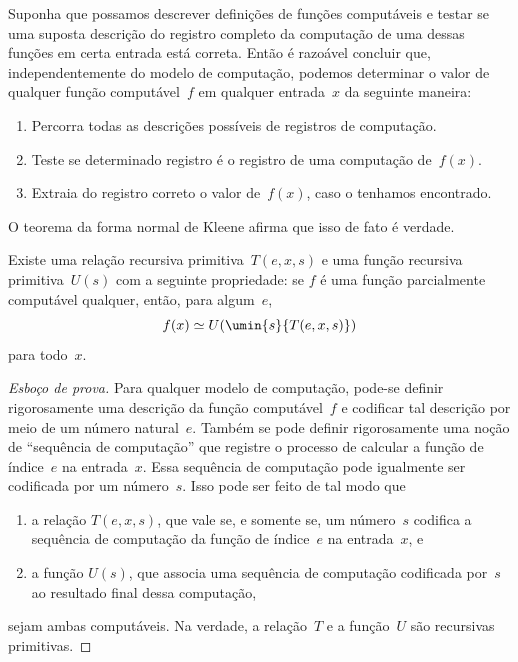\documentclass[../../../include/open-logic-section]{subfiles}
\begin{document}

Suponha que possamos descrever definições de funções computáveis e
testar se uma suposta descrição do registro completo da computação de
uma dessas funções em certa entrada está correta. Então é razoável
concluir que, independentemente do modelo de computação, podemos
determinar o valor de qualquer função computável~$f$ em qualquer
entrada~$x$ da seguinte maneira:
\begin{enumerate}
  \item Percorra todas as descrições possíveis de registros de
  computação.
  \item Teste se determinado registro é o registro de uma computação
  de~$f(x)$.
  \item Extraia do registro correto o valor de~$f(x)$, caso o tenhamos
  encontrado.
\end{enumerate}
O teorema da forma normal de Kleene afirma que isso de fato é verdade.

\begin{thm}
Existe uma relação recursiva primitiva~$T(e, x, s)$ e uma função
recursiva primitiva~$U(s)$ com a seguinte propriedade: se $f$ é uma
função parcialmente computável qualquer, então, para algum~$e$,
\[
f(x) \simeq U(\umin{s}{T(e, x, s)})
\]
para todo~$x$.
\end{thm}

\begin{proof}[Esboço de prova]
Para qualquer modelo de computação, pode-se definir rigorosamente uma
descrição da função computável~$f$ e codificar tal descrição por meio
de um número natural~$e$. Também se pode definir rigorosamente uma noção
de ``sequência de computação'' que registre o processo de calcular a
função de índice~$e$ na entrada~$x$. Essa sequência de computação pode
igualmente ser codificada por um número~$s$. Isso pode ser feito de tal
modo que
\begin{enumerate}
  \item a relação $T(e, x, s)$, que vale se, e somente se, um número~$s$
  codifica a sequência de computação da função de índice~$e$ na
  entrada~$x$, e
  \item a função $U(s)$, que associa uma sequência de computação
  codificada por~$s$ ao resultado final dessa computação,
\end{enumerate}
sejam ambas computáveis. Na verdade, a relação~$T$ e a função~$U$
são recursivas primitivas.
\end{proof}
\end{document}
